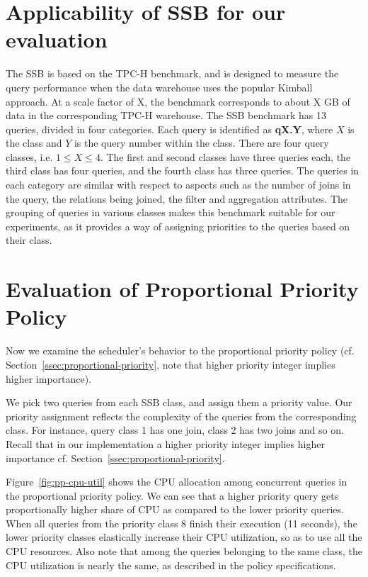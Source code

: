 \section{Applicability of SSB for our evaluation}\label{apx:ssb}
The SSB is based on the TPC-H benchmark, and is designed to measure the query performance when %
the data warehouse uses the popular Kimball~\cite{Kimball} approach. 
At a scale factor of X, the benchmark corresponds to about X GB of data in the 
corresponding TPC-H warehouse.
The SSB benchmark has 13 queries, divided in four categories. 
Each query is identified as \textbf{qX.Y}, where $X$ is the class and $Y$ is the query 
number within the class.
There are four query classes, i.e. $1\leq X\leq4$. 
The first and second classes have three queries each, the third class has four queries, and 
the fourth class has three queries.
The queries in each category are similar with respect to aspects such as the 
number of joins in the query, the relations being joined, the filter and aggregation 
attributes. 
The grouping of queries in various classes makes this benchmark suitable for our 
experiments, as it provides a way of assigning priorities to the queries based on their class. 

\section{Evaluation of Proportional Priority Policy}\label{apx:pp-policy-exp}
Now we examine the scheduler's behavior to the proportional priority policy (cf. Section~\ref{ssec:proportional-priority}, note that higher priority integer implies higher importance).

We pick two queries from each SSB class, and assign them a priority value. 
Our priority assignment reflects the complexity of the queries from the corresponding class. 
For instance, query class 1 has one join, class 2 has two joins and so on.
Recall that in our implementation a higher priority integer implies higher importance cf. 
Section~\ref{ssec:proportional-priority}.

Figure~\ref{fig:pp-cpu-util} shows the CPU allocation among concurrent queries in the proportional priority policy.
We can see that a higher priority query gets proportionally higher share of CPU as 
compared to the lower priority queries.
When all queries from the priority class 8 finish their execution (11 seconds), the 
lower priority classes elastically increase their CPU utilization, so as to use all the CPU 
resources. 
Also note that among the queries belonging to the same class, the CPU utilization is 
nearly the same, as described in the policy specifications.

